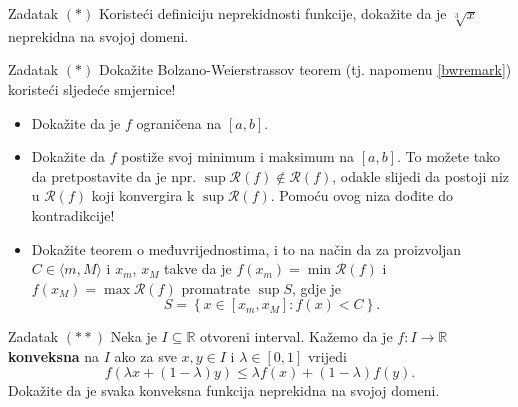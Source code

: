 \begin{exercise}{Zadatak} \((*)\)
Koristeći definiciju neprekidnosti funkcije, dokažite da je \(\sqrt[3]{x}\) neprekidna na svojoj domeni.
\end{exercise}
\begin{exercise}{Zadatak} \((*)\)
Dokažite Bolzano-Weierstrassov teorem (tj. napomenu \ref{bwremark}) koristeći sljedeće smjernice!
\begin{itemize}
\item[a)] Dokažite da je $f$ ograničena na $[a, b]$.
\item[b)] Dokažite da $f$ postiže svoj minimum i maksimum na $[a, b]$. To možete tako da pretpostavite da je npr. $\sup{\mathcal{R}(f)}\notin \mathcal{R}(f)$, odakle slijedi da postoji niz u $\mathcal{R}(f)$ koji konvergira k $\sup{\mathcal{R}(f)}$. Pomoću ovog niza dođite do kontradikcije!
\item[c)] Dokažite teorem o međuvrijednostima, i to na način da za proizvoljan $C\in \langle m, M\rangle$ i $x_m$, $x_M$ takve da je $f(x_m)=\min{\mathcal{R}(f)}$ i $f(x_M)=\max{\mathcal{R}(f)}$ promatrate $\sup{S}$, gdje je
$$S=\left\{ x\in [x_m, x_M] : f(x)<C\right\}.$$
\end{itemize}
\end{exercise}
\begin{exercise}{Zadatak} \((**)\)
Neka je \(I\subseteq \mathbb{R}\) otvoreni interval. Kažemo da je \(f : I\to \mathbb{R}\) \textbf{konveksna} na $I$ ako za sve $x, y\in I$ i $\lambda \in \left[0, 1\right]$ vrijedi
$$f\left(\lambda x+\left(1-\lambda\right)y\right)\leq \lambda f(x)+\left(1-\lambda\right)f(y).$$
Dokažite da je svaka konveksna funkcija neprekidna na svojoj domeni.
\end{exercise}
